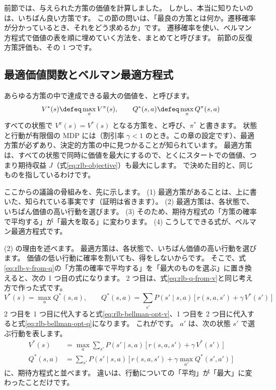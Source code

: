 前節では、与えられた方策の価値を計算しました。
しかし、本当に知りたいのは、いちばん良い方策です。
この節の問いは、「最良の方策とは何か。遷移確率が分かっているとき、それをどう求めるか」です。
遷移確率を使い、ベルマン方程式で価値の表を順に埋めていく方法を、まとめてと呼びます\cite{bellman1957dynamic}。
前節の反復方策評価も、その 1 つです。

\subsection*{最適価値関数とベルマン最適方程式}

あらゆる方策の中で達成できる最大の価値を、と呼びます。
\begin{equation}
V^\ast(s)\defeq\max_\pi V^\pi(s),\qquad Q^\ast(s,a)\defeq\max_\pi Q^\pi(s,a)
\label{eq:rlb-optimal}
\end{equation}
すべての状態で $V^\pi(s)=V^\ast(s)$ となる方策を、と呼び、$\pi^\ast$ と書きます。
状態と行動が有限個の MDP には（割引率 $\gamma<1$ のとき。この章の設定です）、最適方策が必ずあり、決定的方策の中に見つかることが知られています\cite{sutton2018rl}。
最適方策は、すべての状態で同時に価値を最大にするので、とくにスタートでの価値、つまり期待収益 $J$（式\eqref{eq:rlb-objective}）も最大にします。
で決めた目的と、同じものを指しているわけです。

ここからの議論の骨組みを、先に示します。
(1) 最適方策があることは、上に書いた、知られている事実です（証明は省きます）。
(2) 最適方策は、各状態で、いちばん価値の高い行動を選びます。
(3) そのため、期待方程式の「方策の確率で平均する」が「最大を取る」に変わります。
(4) こうしてできる式が、ベルマン最適方程式です。

(2) の理由を述べます。
最適方策は、各状態で、いちばん価値の高い行動を選びます。
価値の低い行動に確率を割いても、得をしないからです。
そこで、式\eqref{eq:rlb-v-from-q}の「方策の確率で平均する」を「最大のものを選ぶ」に置き換えると、次の 1 つ目の式になります。
2 つ目は、式\eqref{eq:rlb-q-from-v}と同じ考え方で作った式です。
\[
V^\ast(s)=\max_a Q^\ast(s,a),\qquad
Q^\ast(s,a)=\sum_{s'}P(s'\mid s,a)\,\bigl[\,r(s,a,s')+\gamma\,V^\ast(s')\,\bigr]
\]
2 つ目を 1 つ目に代入すると式\eqref{eq:rlb-bellman-opt-v}、1 つ目を 2 つ目に代入すると式\eqref{eq:rlb-bellman-opt-q}になります。
これがです。
$a'$ は、次の状態 $s'$ で選ぶ行動を表します。
\begin{align}
V^\ast(s)&=\max_a\sum_{s'}P(s'\mid s,a)\,\bigl[\,r(s,a,s')+\gamma\,V^\ast(s')\,\bigr]
\label{eq:rlb-bellman-opt-v}\\
Q^\ast(s,a)&=\sum_{s'}P(s'\mid s,a)\,\bigl[\,r(s,a,s')+\gamma\max_{a'}Q^\ast(s',a')\,\bigr]
\label{eq:rlb-bellman-opt-q}
\end{align}
に、期待方程式と並べます。
違いは、行動についての「平均」が「最大」に変わったことだけです。

